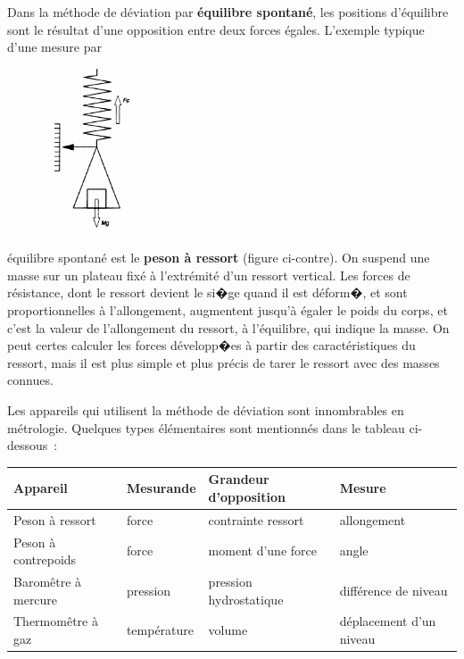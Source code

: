 Dans la méthode de déviation par \textbf{équilibre spontané}, les positions d'équilibre sont le résultat d'une opposition entre deux forces égales. L'exemple typique d'une mesure par \begin{figure}
   \centering
   \includegraphics[width=3cm]{assets/figures/mesdev.pdf}
\end{figure}
équilibre spontané est le \textbf{peson à ressort} (figure ci-contre). On suspend une masse sur un plateau fixé à l'extrémité d'un ressort vertical. Les forces de résistance, dont le ressort devient le si�ge quand il est déform�, et sont proportionnelles à l'allongement, augmentent jusqu'à égaler le poids du corps, et c'est la valeur de l'allongement du ressort, à l'équilibre, qui indique la masse. On peut certes calculer les forces développ�es à partir des caractéristiques du ressort, mais il est plus simple et plus précis de tarer le ressort avec des masses connues.

Les appareils qui utilisent la méthode de déviation sont innombrables en métrologie. Quelques types élémentaires sont mentionnés dans le tableau ci-dessous~:
\begin{center}
\begin{tabular}{llll}
Appareil	 & Mesurande & Grandeur d'opposition & Mesure\\ \hline
Peson à ressort & force & contrainte ressort & allongement\\
Peson à contrepoids & force & moment d'une force & angle\\
Baromêtre à mercure & pression & pression hydrostatique & différence de niveau\\
Thermomêtre à gaz & température & volume & déplacement d'un niveau
\end{tabular}
\end{center}

